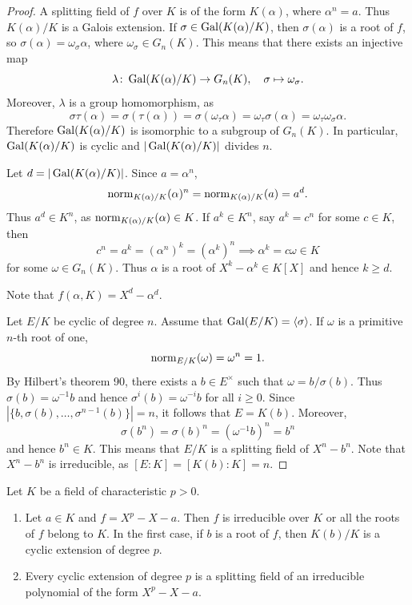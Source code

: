\begin{proof}
    A splitting field of $f$ over $K$ is
    of the form $K(\alpha)$, where $\alpha^n=a$. Thus 
    $K(\alpha)/K$ is a Galois extension. If $\sigma\in\operatorname{Gal}(K(\alpha)/K)$, 
    then $\sigma(\alpha)$ is a root of $f$, so 
    $\sigma(\alpha)=\omega_\sigma\alpha$, where
    $\omega_\sigma\in G_n(K)$. This means that 
    there exists an injective map
    \[
    \lambda\colon\operatorname{Gal}(K(\alpha)/K)\to G_n(K),
    \quad
    \sigma\mapsto\omega_{\sigma}.
    \]
    Moreover, $\lambda$ is a group homomorphism, as 
    \[
    \sigma\tau(\alpha)=\sigma(\tau(\alpha))=\sigma(\omega_{\tau}\alpha)=\omega_\tau\sigma(\alpha)=\omega_{\tau}\omega_{\sigma}\alpha.
    \]
    Therefore $\operatorname{Gal}(K(\alpha)/K)$ is isomorphic to a subgroup
    of $G_n(K)$. In particular, $\operatorname{Gal}(K(\alpha)/K)$ is cyclic
    and $|\operatorname{Gal}(K(\alpha)/K)|$ divides $n$.
    
    
    Let $d=|\operatorname{Gal}(K(\alpha)/K)|$. Since $a=\alpha^n$, 
    \[
    \operatorname{norm}_{K(\alpha)/K}(\alpha)^n=\operatorname{norm}_{K(\alpha)/K}(a)=a^d.
    \]
    Thus $a^d\in K^n$, as $\operatorname{norm}_{K(\alpha)/K}(\alpha)\in K$. If $a^k\in K^n$, 
    say $a^k=c^n$ for some $c\in K$, then 
    \[
    c^n=a^k=(\alpha^n)^k=(\alpha^k)^n
    \implies 
    \alpha^k=c\omega\in K
    \]
    for some $\omega\in G_n(K)$. Thus $\alpha$ is a root of $X^k-\alpha^k\in K[X]$
    and hence $k\geq d$. 
    
    Note that $f(\alpha,K)=X^d-\alpha^d$. 
    
    Let $E/K$ be cyclic of degree $n$. Assume that  
    $\operatorname{Gal}(E/K)=\langle\sigma\rangle$.
    If $\omega$ is a primitive
    $n$-th root of one, 
    \[
    \operatorname{norm}_{E/K}(\omega)=\omega^n=1.
    \]
    By Hilbert's theorem 90, 
    there exists a $b\in E^{\times}$ such that 
    $\omega=b/\sigma(b)$. Thus
    $\sigma(b)=\omega^{-1} b$ and hence 
    $\sigma^i(b)=\omega^{-i} b$ for all $i\geq0$. Since 
    $|\{b,\sigma(b),\dots,\sigma^{n-1}(b)\}|=n$, 
    it follows that $E=K(b)$. Moreover, 
    \[
    \sigma(b^n)=\sigma(b)^n=(\omega^{-1} b)^n=b^n
    \]
    and hence $b^n\in K$. This means that $E/K$ is a splitting 
    field of $X^n-b^n$. Note that $X^n-b^n$ is irreducible, as 
    $[E:K]=[K(b):K]=n$. 
\end{proof}

\begin{proposition}
    Let $K$ be a field of characteristic $p>0$. 
    \begin{enumerate}
        \item Let $a\in K$ and $f=X^p-X-a$. Then 
        $f$ is irreducible over $K$ or all the roots of 
        $f$ belong to $K$. 
        In the first case, if $b$ is a root of $f$, then 
        $K(b)/K$ is a cyclic extension of degree $p$. 
        \item Every cyclic extension of degree $p$ 
        is a splitting field of an irreducible
        polynomial of the form $X^p-X-a$. 
    \end{enumerate}
\end{proposition}


